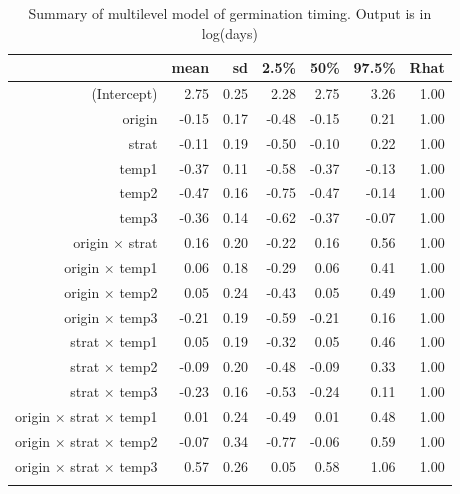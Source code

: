 \documentclass[12pt]{article}\usepackage[]{graphicx}\usepackage[]{color}
\begin{document}
\begin{longtable}{rrrrrrr}
\caption{Summary of multilevel model of germination timing. Output is in log(days)} \\ 
  & mean & sd & 2.5\% & 50\% & 97.5\% & Rhat \\ 
  \hline
(Intercept) & 2.75 & 0.25 & 2.28 & 2.75 & 3.26 & 1.00 \\ 
  origin & -0.15 & 0.17 & -0.48 & -0.15 & 0.21 & 1.00 \\ 
  strat & -0.11 & 0.19 & -0.50 & -0.10 & 0.22 & 1.00 \\ 
  temp1 & -0.37 & 0.11 & -0.58 & -0.37 & -0.13 & 1.00 \\ 
  temp2 & -0.47 & 0.16 & -0.75 & -0.47 & -0.14 & 1.00 \\ 
  temp3 & -0.36 & 0.14 & -0.62 & -0.37 & -0.07 & 1.00 \\ 
  origin $\times$ strat & 0.16 & 0.20 & -0.22 & 0.16 & 0.56 & 1.00 \\ 
  origin $\times$ temp1 & 0.06 & 0.18 & -0.29 & 0.06 & 0.41 & 1.00 \\ 
  origin $\times$ temp2 & 0.05 & 0.24 & -0.43 & 0.05 & 0.49 & 1.00 \\ 
  origin $\times$ temp3 & -0.21 & 0.19 & -0.59 & -0.21 & 0.16 & 1.00 \\ 
  strat $\times$ temp1 & 0.05 & 0.19 & -0.32 & 0.05 & 0.46 & 1.00 \\ 
  strat $\times$ temp2 & -0.09 & 0.20 & -0.48 & -0.09 & 0.33 & 1.00 \\ 
  strat $\times$ temp3 & -0.23 & 0.16 & -0.53 & -0.24 & 0.11 & 1.00 \\ 
  origin $\times$ strat $\times$ temp1 & 0.01 & 0.24 & -0.49 & 0.01 & 0.48 & 1.00 \\ 
  origin $\times$ strat $\times$ temp2 & -0.07 & 0.34 & -0.77 & -0.06 & 0.59 & 1.00 \\ 
  origin $\times$ strat $\times$ temp3 & 0.57 & 0.26 & 0.05 & 0.58 & 1.06 & 1.00 \\ 
  \hline
\label{tab:mod_time}
\end{longtable}
\end{document}
